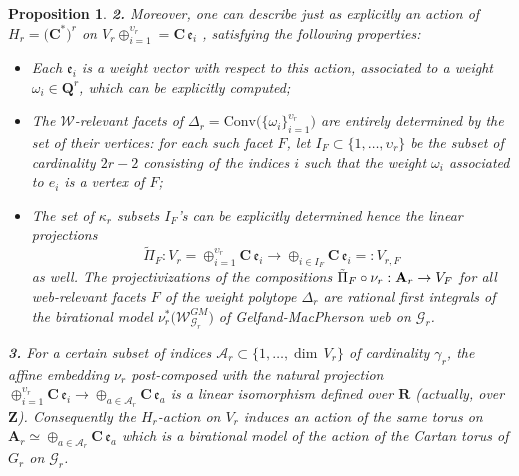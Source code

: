 \documentclass[11pt]{amsart}
\newcommand{\sk}{\smallskip}
\newtheorem{prop}[thm]{Proposition}
\begin{document}
\begin{prop}
\noindent 
{\bf 2.} Moreover, one can describe just as explicitly an action of 
\( H_r=\big(\mathbf{C}^*\big)^r \) on \( V_r\oplus_{i=1}^{\upsilon_r} =\mathbf{C} \, \mathfrak e_i \) , satisfying the following properties:
\begin{itemize}%
    \item[$-$]  Each $ \mathfrak e_i$ is a weight vector with respect to this action, associated to a weight 
   $\omega_i\in \mathbf Q^r$, which can be explicitly computed; 
    \sk 
    \item[$-$] 
    The \( \mathcal{W} \)-relevant facets of 
     \( \Delta_r = \mathrm{Conv}\big(\{ \omega_i \}_{i=1}^{ \upsilon_r}\big) \)
    are entirely determined by the set of their vertices:
          for each such facet \( F \), let $
    I_F \subset \{1, \ldots, \upsilon_r\}
    $ 
    be the subset of cardinality \( 2r - 2 \) consisting of the indices \( i \) such that 
    the weight 
    $\omega_i$ associated to 
    \( e_i \) is a vertex of \( F \);
 \sk 
  \item[$-$]  The set of $\kappa_r$ subsets $I_F$'s can be explicitly determined hence the linear projections 
  $$\tilde \Pi_F: V_r= \oplus_{i=1}^{\upsilon_r} \mathbf{C} \, \mathfrak e_i\rightarrow \oplus_{i \in I_F} \mathbf{C} \, \mathfrak e_i=:V_{r,F}$$ as well.  
 The projectivizations of the compositions $\tilde \Pi_F\circ \nu_r: {\bf A}_r \rightarrow V_F$ for all web-relevant facets $F$ of the weight polytope $\Delta_r$ are rational first integrals of the birational model $\nu_r^*\big( \boldsymbol{\mathcal W}^{GM}_{ \boldsymbol{\mathcal G}_r}\big)$ of Gelfand-MacPherson web on $\boldsymbol{\mathcal G}_r$.
\end{itemize}%



    






\noindent 
{\bf 3.} For a certain subset of indices $\mathcal A_r\subset \{1,\ldots, \dim \, V_r\}$ 
of cardinality $\gamma_r$, the affine embedding $\nu_r$  post-composed with 
the natural projection $\oplus_{i=1}^{\upsilon_r} \mathbf{C} \,\mathfrak e_i\rightarrow \oplus_{a \in {\mathcal  A}_r } \mathbf{C} \,\mathfrak e_a$ is a linear isomorphism defined over $\mathbf R$ (actually, over $\mathbf Z$).  Consequently the $H_r$-action on $V_r$ induces an action of the same torus on $  \mathbf{A}_r\simeq 
\oplus_{a \in {\mathcal  A}_r } \mathbf{C} \,\mathfrak e_a$ which 
is a birational model of the action of the Cartan torus of
 $G_r$ on $\boldsymbol{\mathcal G}_r$. 





\end{prop}
\end{document}
